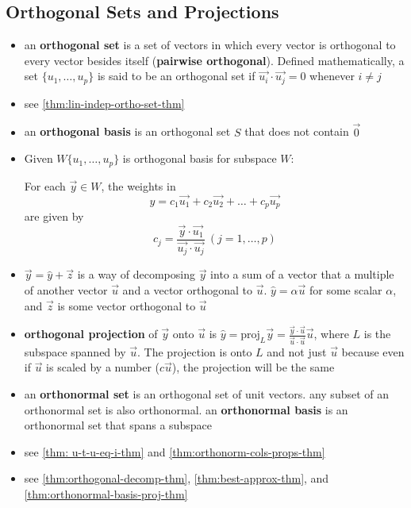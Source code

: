 \documentclass[a4paper,12pt]{article}
\theoremstyle{definition}
\theoremstyle{definition}
\newcommand{\finitevecs}[2]{#1_1,\ldots,#1_#2}
\newcommand{\finitevecsset}[2]{\{\finitevecs{#1}{#2}\}}
\newcommand{\finiteadd}[3]{#1 + #2 + \ldots + #3}
\newcommand{\dotprod}[2]{#1 \cdot #2}
\newcommand{\dotprodvecs}[2]{\dotprod{\vec{#1}}{\vec{#2}}}
\newcommand{\orthoproj}[2]{\frac{\dotprodvecs{#1}{#2}}{\dotprodvecs{#2}{#2}}\vec{#2}}
\begin{document}
	\subsection{Orthogonal Sets and Projections}
	\begin{itemize}
		\item an \textbf{orthogonal set} is a set of vectors in which every vector is orthogonal to every vector besides itself (\textbf{pairwise orthogonal}). Defined mathematically, a set $\finitevecsset{u}{p}$ is said to be an orthogonal set if $\dotprodvecs{u_i}{u_j} = 0$ whenever $i \neq j$
		
		\item see \autoref{thm:lin-indep-ortho-set-thm}
		
		\item an \textbf{orthogonal basis} is an orthogonal set $S$ that does not contain $\vec{0}$
		
		\item Given $W\finitevecsset{u}{p}$ is orthogonal basis for subspace $W$:
		
		For each $\vec{y} \in W$, the weights in
		\begin{equation*}
			y = \finiteadd{c_1\vec{u_1}}{c_2\vec{u_2}}{c_p\vec{u_p}}
		\end{equation*}
		are given by
		\begin{equation*}
			c_j = \frac{\dotprodvecs{y}{u_1}}{\dotprodvecs{u_j}{u_j}} \: (j = 1, \ldots, p)
		\end{equation*}
		
		\item $\vec{y} = \hat{y} + \vec{z}$ is a way of decomposing $\vec{y}$ into a sum of a vector that a multiple of another vector $\vec{u}$ and a vector orthogonal to $\vec{u}$. $\hat{y} = \alpha\vec{u}$ for some scalar $\alpha$, and $\vec{z}$ is some vector orthogonal to $\vec{u}$
		
		\item \textbf{orthogonal projection} of $\vec{y}$ onto $\vec{u}$ is $\hat{y} = \text{proj}_L\vec{y} = \orthoproj{y}{u}$, where $L$ is the subspace spanned by $\vec{u}$. The projection is onto $L$ and not just $\vec{u}$ because even if $\vec{u}$ is scaled by a number ($c\vec{u}$), the projection will be the same
		
		\item an \textbf{orthonormal set} is an orthogonal set of unit vectors. any subset of an orthonormal set is also orthonormal. an \textbf{orthonormal basis} is an orthonormal set that spans a subspace
		
		\item see \autoref{thm: u-t-u-eq-i-thm} and
		\autoref{thm:orthonorm-cols-props-thm}
		
		\item see \autoref{thm:orthogonal-decomp-thm}, \autoref{thm:best-approx-thm}, and \autoref{thm:orthonormal-basis-proj-thm}
	\end{itemize}
	
\end{document}
